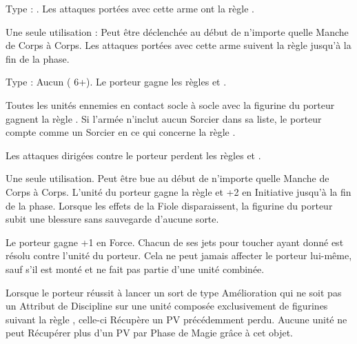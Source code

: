 Type : \hw{}. Les attaques portées avec cette arme ont la règle .

Une seule utilisation : Peut être déclenchée au début de n'importe quelle Manche de Corps à Corps. Les attaques portées avec cette arme suivent la règle \metalshifting{} jusqu'à la fin de la phase.

\endpricelist

\armymagicalarmour

\startpricelist

Type : Aucun (\armoursave{} 6+). Le porteur gagne les règles  et \fireborn{}.

\endpricelist

\armytalismans

\startpricelist

Toutes les unités ennemies en contact socle à socle avec la figurine du porteur gagnent la règle \flammable{}. Si l'armée n'inclut aucun Sorcier dans sa liste, le porteur compte comme un Sorcier en ce qui concerne la règle \shacklesoffire{}.

Les attaques dirigées contre le porteur perdent les règles \poisonedattacks{} et .

\endpricelist

\armyenchanteditems

\startpricelist

Une seule utilisation. Peut être bue au début de n'importe quelle Manche de Corps à Corps. L'unité du porteur gagne la règle \lightningreflexes{} et +2 en Initiative jusqu'à la fin de la phase. Lorsque les effets de la Fiole disparaissent, la figurine du porteur subit une blessure sans sauvegarde d'aucune sorte.

Le porteur gagne +1 en Force. Chacun de ses jets pour toucher ayant donné  est résolu contre l'unité du porteur. Cela ne peut jamais affecter le porteur lui-même, sauf s'il est monté et ne fait pas partie d'une unité combinée.

\endpricelist

\armyarcaneitems

\startpricelist

Lorsque le porteur réussit à lancer un sort de type Amélioration qui ne soit pas un Attribut de Discipline sur une unité composée exclusivement de figurines suivant la règle \shacklesoffire{}, celle-ci Récupère un PV précédemment perdu. Aucune unité ne peut Récupérer plus d'un PV par Phase de Magie grâce à cet objet.


